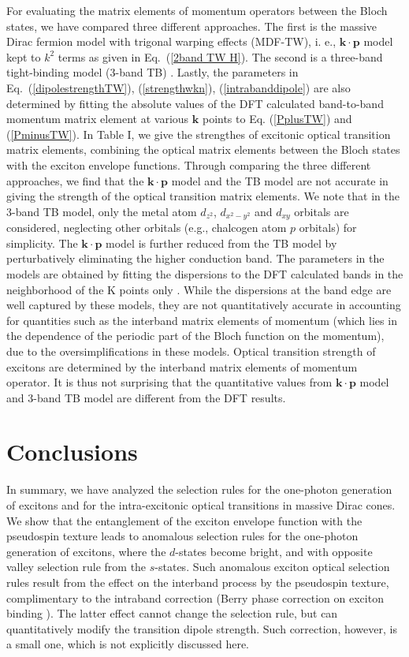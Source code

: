 \documentclass[prb,twocolumn,amsmath,amssymb,superscriptaddress,showpacs]{revtex4}
\begin{document}
For evaluating the matrix elements of momentum operators between the Bloch states, we have compared three different approaches. The first is the massive Dirac fermion model with trigonal warping effects (MDF-TW), i. e., $\mathbf k\cdot\mathbf p$ model kept to $k^2$ terms as given in Eq.~(\ref{2band TW H}). The second is a three-band tight-binding model (3-band TB) \cite{Guibin 3bandTB PRB 2014}. Lastly, the parameters in Eq.~(\ref{dipolestrengthTW}), (\ref{strengthwkn}), (\ref{intrabanddipole}) are also determined by fitting the absolute values of the DFT calculated band-to-band momentum matrix element at various $\mathbf k$ points to Eq. (\ref{PplusTW}) and (\ref{PminusTW}). In Table I, we give the strengthes of excitonic optical transition matrix elements, combining the optical matrix elements between the Bloch states with the exciton envelope functions. Through comparing the three different approaches, we find that the  $\mathbf k \cdot\mathbf p$ model and the TB model are not accurate in giving the strength of the optical transition matrix elements. We note that in the 3-band TB model, only the metal atom $d_{z^2}$, $d_{x^2-y^2}$ and $d_{xy}$ orbitals are considered, neglecting other orbitals (e.g., chalcogen atom $p$ orbitals) for simplicity. The $\mathbf k\cdot\mathbf p$ model is further reduced from the TB model by perturbatively eliminating the higher conduction band. The parameters in the models are obtained by fitting the dispersions to the DFT calculated bands in the neighborhood of the K points only \cite{Guibin 3bandTB PRB 2014}. While the dispersions at the band edge are well captured by these models, they are not quantitatively accurate in accounting for quantities such as the interband matrix elements of momentum (which lies in the dependence of the periodic part of the Bloch function on the momentum), due to the oversimplifications in these models. Optical transition strength of excitons are determined by the interband matrix elements of momentum operator. It is thus not surprising that the quantitative values from $\mathbf k\cdot\mathbf p$ model and 3-band TB model are different from the DFT results.


\section{Conclusions}
In summary, we have analyzed the selection rules for the one-photon generation of excitons and for the intra-excitonic optical transitions in massive Dirac cones. We show that the entanglement of the exciton envelope function with the pseudospin texture leads to anomalous selection rules for the one-photon generation of excitons, where the $d$-states become bright, and with opposite valley selection rule from the $s$-states. Such anomalous exciton optical selection rules result from the effect on the interband process by the pseudospin texture, complimentary to the intraband correction (Berry phase correction on exciton binding \cite{Imamoglu p-state Berry splitting 2015, Di Xiao Berry phase and exciton 2015}). The latter effect cannot change the selection rule, but can quantitatively modify the transition dipole strength. Such correction, however, is a small one, which is not explicitly discussed here.
\end{document}
